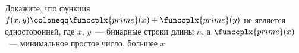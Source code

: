 Докажите, что функция $f(x, y) \coloneqq \funccplx{prime}(x) + \funccplx{prime}(y)$ не является
односторонней, где $x$, $y$~--- бинарные строки длины $n$, а $\funccplx{prime}(x)$~--- минимальное
простое число, большее $x$.
